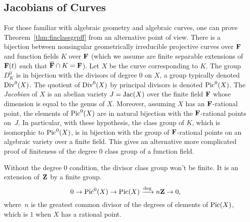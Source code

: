 \subsection{Jacobians of Curves}
For those familiar with algebraic geometry and algebraic curves, one
can prove Theorem~\ref{thm:finclassgrpff} from an alternative point of
view.  There is a bijection between nonsingular geometrically
irreducible projective curves over $\mathbf{F}$ and function fields $K$ over
$\mathbf{F}$ (which we assume are finite separable extensions of $\mathbf{F}(t)$ such
that $\overline{\mathbf{F}}\cap K = \mathbf{F}$).  Let $X$ be the curve corresponding to $K$.
The group $D_K^0$ is in bijection with the divisors of degree $0$ on
$X$, a group typically denoted $\operatorname{Div}^0(X)$.  The quotient of
$\operatorname{Div}^0(X)$ by principal divisors is denoted $\operatorname{Pic}^0(X)$.  The {\em
  Jacobian} of $X$ is an abelian variety $J=\operatorname{Jac}(X)$ over the finite
field $\mathbf{F}$ whose dimension is equal to the genus of $X$.  Moreover,
assuming $X$ has an $\mathbf{F}$-rational point, the elements of $\operatorname{Pic}^0(X)$
are in natural bijection with the $\mathbf{F}$-rational points on~$J$.  In
particular, with these hypothesis, the class group of $K$, which is
isomorphic to $\operatorname{Pic}^0(X)$, is in bijection with the group of
$\mathbf{F}$-rational points on an algebraic variety over a finite field.
This gives an alternative more complicated proof of finiteness of the
degree $0$ class group of a function field.  

Without the degree $0$ condition, the divisor class group won't be finite.  It
is an extension of~$\mathbf{Z}$ by a finite group.
$$
  0 \to \operatorname{Pic}^0(X) \to \operatorname{Pic}(X) \xrightarrow{\deg} n\mathbf{Z} \to 0,
$$
where~$n$ is the greatest common divisor of the degrees of 
elements of $\operatorname{Pic}(X)$, which is $1$ when $X$ has a rational 
point.



